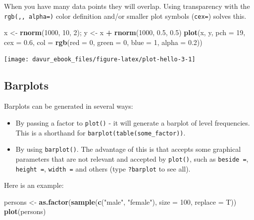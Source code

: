 \documentclass[]{book}
\newenvironment{Shaded}{\begin{snugshade}}{\end{snugshade}}
\newcommand{\DataTypeTok}[1]{\textcolor[rgb]{0.13,0.29,0.53}{#1}}
\newcommand{\DecValTok}[1]{\textcolor[rgb]{0.00,0.00,0.81}{#1}}
\newcommand{\FloatTok}[1]{\textcolor[rgb]{0.00,0.00,0.81}{#1}}
\newcommand{\KeywordTok}[1]{\textcolor[rgb]{0.13,0.29,0.53}{\textbf{#1}}}
\newcommand{\NormalTok}[1]{#1}
\newcommand{\OperatorTok}[1]{\textcolor[rgb]{0.81,0.36,0.00}{\textbf{#1}}}
\newcommand{\StringTok}[1]{\textcolor[rgb]{0.31,0.60,0.02}{#1}}
\providecommand{\tightlist}{%
  \setlength{\itemsep}{0pt}\setlength{\parskip}{0pt}}
\begin{document}
When you have many data points they will overlap. Using transparency with the \texttt{rgb(,,\ alpha=)} color definition and/or smaller plot symbols (\texttt{cex=}) solves this.

\begin{Shaded}
\begin{Highlighting}[]
\NormalTok{x <-}\StringTok{ }\KeywordTok{rnorm}\NormalTok{(}\DecValTok{1000}\NormalTok{, }\DecValTok{10}\NormalTok{, }\DecValTok{2}\NormalTok{); y <-}\StringTok{ }\NormalTok{x }\OperatorTok{+}\StringTok{ }\KeywordTok{rnorm}\NormalTok{(}\DecValTok{1000}\NormalTok{, }\FloatTok{0.5}\NormalTok{, }\FloatTok{0.5}\NormalTok{)}
\KeywordTok{plot}\NormalTok{(x, y, }\DataTypeTok{pch =} \DecValTok{19}\NormalTok{, }\DataTypeTok{cex =} \FloatTok{0.6}\NormalTok{,}
     \DataTypeTok{col =} \KeywordTok{rgb}\NormalTok{(}\DataTypeTok{red =} \DecValTok{0}\NormalTok{, }\DataTypeTok{green =} \DecValTok{0}\NormalTok{, }\DataTypeTok{blue =} \DecValTok{1}\NormalTok{, }\DataTypeTok{alpha =} \FloatTok{0.2}\NormalTok{))}
\end{Highlighting}
\end{Shaded}

\begin{center}\texttt{[image: davur\_ebook\_files/figure-latex/plot-hello-3-1]} \end{center}

\hypertarget{barplots}{%
\subsection{Barplots}\label{barplots}}

Barplots can be generated in several ways:

\begin{itemize}
\tightlist
\item
  By passing a factor to \texttt{plot()} - it will generate a barplot of level frequencies. This is a shorthand for \texttt{barplot(table(some\_factor))}.
\item
  By using \texttt{barplot()}. The advantage of this is that accepts some graphical parameters that are not relevant and accepted by \texttt{plot()}, such as \texttt{beside\ =}, \texttt{height\ =}, \texttt{width\ =} and others (type \texttt{?barplot} to see all).
\end{itemize}

Here is an example:

\begin{Shaded}
\begin{Highlighting}[]
\NormalTok{persons <-}\StringTok{ }\KeywordTok{as.factor}\NormalTok{(}\KeywordTok{sample}\NormalTok{(}\KeywordTok{c}\NormalTok{(}\StringTok{"male"}\NormalTok{, }\StringTok{"female"}\NormalTok{), }\DataTypeTok{size =} \DecValTok{100}\NormalTok{, }\DataTypeTok{replace =}\NormalTok{ T))}
\KeywordTok{plot}\NormalTok{(persons)}
\end{Highlighting}
\end{Shaded}
\end{document}
